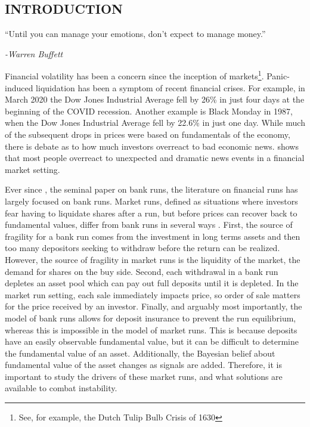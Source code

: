 \documentclass[thesis]{uathesis}
\author{Caleb Eynon}
\title{To Sell or Not to Sell: The Psychology \and
  of Market Runs}
\begin{document}
\makefrontmatter

\begin{body}

\chapter{INTRODUCTION}

\epigraph{``Until you can manage your emotions, don't expect to manage money.''}{\textit{-Warren Buffett}}

Financial volatility has been a concern since the inception of markets\footnote{See, for example, the Dutch Tulip Bulb Crisis of 1630}. Panic-induced liquidation has been a symptom of recent financial crises. For example, in March 2020 the Dow Jones Industrial Average fell by 26\% in just four days at the beginning of the COVID recession. Another example is Black Monday in 1987, when the Dow Jones Industrial Average fell by 22.6\% in just one day. While much of the subsequent drops in prices were based on fundamentals of the economy, there is debate as to how much investors overreact to bad economic news. \cite{thaler1985} shows that most people overreact to unexpected and dramatic news events in a financial market setting.

Ever since \cite{diamond1983bank}, the seminal paper on bank runs, the literature on financial runs has largely focused on bank runs. Market runs, defined as situations where investors fear having to liquidate shares after a run, but before prices can recover back to fundamental values, differ from bank runs in several ways \citep{bernardo2004liquidity}. First, the source of fragility for a bank run comes from the investment in long terms assets and then too many depositors seeking to withdraw before the return can be realized. However, the source of fragility in market runs is the liquidity of the market, the demand for shares on the buy side. Second, each withdrawal in a bank run depletes an asset pool which can pay out full deposits until it is depleted. In the market run setting, each sale immediately impacts price, so order of sale matters for the price received by an investor. Finally, and arguably most importantly, the model of bank runs allows for deposit insurance to prevent the run equilibrium, whereas this is impossible in the model of market runs. This is because deposits have an easily observable fundamental value, but it can be difficult to determine the fundamental value of an asset. Additionally, the Bayesian belief about fundamental value of the asset changes as signals are added. Therefore, it is important to study the drivers of these market runs, and what solutions are available to combat instability.


\end{body}
\end{document}
